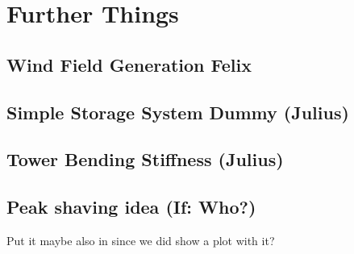 \chapter{Further Things}
\section{Wind Field Generation Felix}


\section{Simple Storage System Dummy (Julius)}


\section{Tower Bending Stiffness (Julius)}


\section{Peak shaving idea (If: Who?)}
Put it maybe also in since we did show a plot with it?

